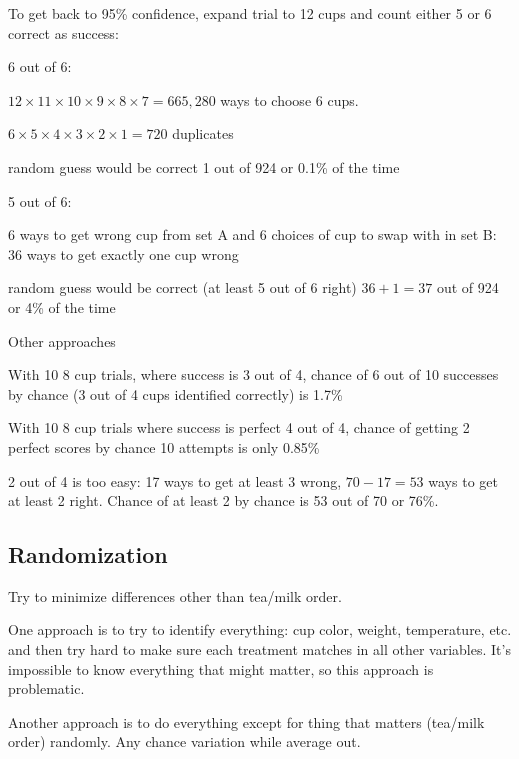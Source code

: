 \documentclass[landscape]{exam}
\begin{document}
  To get back to 95\% confidence, expand trial to 12 cups and count either 5 or
  6 correct as success:

  6 out of 6:
  \begin{itemize*}
    \item $12 \times 11 \times 10 \times 9 \times 8 \times 7 = 665,280$ ways to
      choose 6 cups.  
    \item $6 \times 5 \times 4 \times 3 \times 2 \times 1 = 720$ duplicates
    \item random guess would be correct 1 out of 924 or 0.1\% of the time
  \end{itemize*}

  5 out of 6:
  \begin{itemize*}
    \item 6 ways to get wrong cup from set A and 6 choices of cup to swap with
      in set B: 36 ways to get exactly one cup wrong
    \item random guess would be correct (at least 5 out of 6 right) $36 + 1 =
      37$ out of 924 or 4\% of the time
  \end{itemize*}

  Other approaches
  \begin{itemize*}
    \item With 10 8 cup trials, where success is 3 out of 4, chance of 6 out of
      10 successes by chance (3 out of 4 cups identified correctly) is 1.7\%
      
    \item With 10 8 cup trials where success is perfect 4 out of 4, chance of
      getting 2 perfect scores by chance 10 attempts is only 0.85\%
  \end{itemize*}

  2 out of 4 is too easy: 17 ways to get at least 3 wrong, $70 - 17 = 53$
      ways to get at least 2 right.  Chance of at least 2 by chance is 53 out of
      70 or 76\%.

  \subsection{Randomization}
  Try to minimize differences other than tea/milk order.

  One approach is to try to identify everything: cup color, weight, temperature,
  etc. and then try hard to make sure each treatment matches in all other
  variables.  It's impossible to know everything that might matter, so this
  approach is problematic.

  Another approach is to do everything except for thing that matters (tea/milk
  order) randomly.  Any chance variation while average out.
\end{document}
